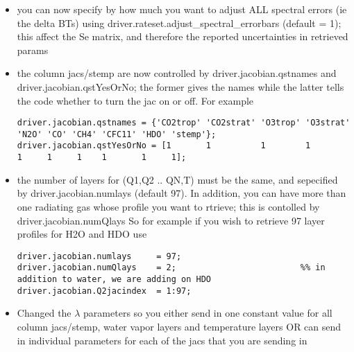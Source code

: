 \documentclass[11pt]{article}
\begin{document}
\begin{itemize}

\item you can now specify by how much you want to adjust ALL spectral errors (ie the delta BTs) using
 driver.rateset.adjust\_spectral\_errorbars (default = 1); 
this affect the Se matrix, and therefore the reported uncertainties in retrieved params

\item the column jacs/stemp are now controlled by driver.jacobian.qstnames and driver.jacobian.qstYesOrNo; the former gives
      the names while the latter tells the code whether to turn the jac on or off. For example

\begin{verbatim}
driver.jacobian.qstnames = {'CO2trop' 'CO2strat' 'O3trop' 'O3strat' 'N2O' 'CO' 'CH4' 'CFC11' 'HDO' 'stemp'};
driver.jacobian.qstYesOrNo = [1       1          1        1         1     1     1    1       1     1];
\end{verbatim}

\item the number of layers for (Q1,Q2 .. QN,T) must be the same, and sepecified by driver.jacobian.numlays (default 97). In addition,
you can have more than one radiating gas whose profile you want to rtrieve; this is contolled by driver.jacobian.numQlays
So for example if you wish to retrieve 97 layer profiles for H2O and HDO use

\begin{verbatim}
driver.jacobian.numlays     = 97;
driver.jacobian.numQlays    = 2;                         %% in addition to water, we are adding on HDO
driver.jacobian.Q2jacindex  = 1:97;
\end{verbatim}

\item Changed the $\lambda$ parameters so you either send in one constant value for all column jacs/stemp, water vapor layers and
temperature layers OR can send in individual parameters for each of the jacs that you are sending in \\


\end{itemize}
\end{document}
